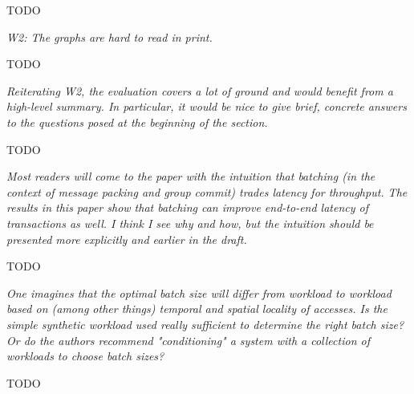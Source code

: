 \documentclass{article}
\begin{document}
\bigskip
TODO
\bigskip

\emph{W2: The graphs are hard to read in print.}

\bigskip
TODO
\bigskip

\emph{Reiterating W2, the evaluation covers a lot of ground and would benefit from a high-level summary. In particular, it would be nice to give brief, concrete answers to the questions posed at the beginning of the section.}


\bigskip
TODO
\bigskip

\emph{Most readers will come to the paper with the intuition that batching (in the context of message packing and group commit) trades latency for throughput. The results in this paper show that batching can improve end-to-end latency of transactions as well. I think I see why and how, but the intuition should be presented more explicitly and earlier in the draft.}


\bigskip
TODO
\bigskip

\emph{One imagines that the optimal batch size will differ from workload to workload based on (among other things) temporal and spatial locality of accesses. Is the simple synthetic workload used really sufficient to determine the right batch size? Or do the authors recommend "conditioning" a system with a collection of workloads to choose batch sizes?}


\bigskip
TODO
\bigskip
\end{document}

